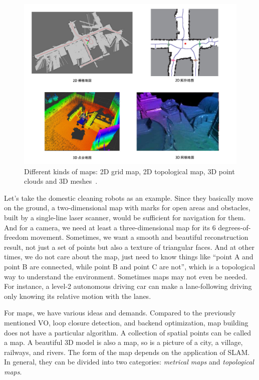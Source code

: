 \begin{figure}
	\centering
	\includegraphics[width=1.0\textwidth]{./resources/whatIsSLAM/map.pdf}
	\caption{Different kinds of maps: 2D grid map, 2D topological map, 3D point clouds and 3D meshes~\cite{Beeson2010}.}
	\label{fig:mapping}
\end{figure}

Let's take the domestic cleaning robots as an example. Since they basically move on the ground, a two-dimensional map with marks for open areas and obstacles, built by a single-line laser scanner, would be sufficient for navigation for them. And for a camera, we need at least a three-dimensional map for its 6 degrees-of-freedom movement. Sometimes, we want a smooth and beautiful reconstruction result, not just a set of points but also a texture of triangular faces. And at other times, we do not care about the map, just need to know things like ``point A and point B are connected, while point B and point C are not'', which is a topological way to understand the environment. Sometimes maps may not even be needed. For instance, a level-2 autonomous driving car can make a lane-following driving only knowing its relative motion with the lanes.

For maps, we have various ideas and demands. Compared to the previously mentioned VO, loop closure detection, and backend optimization, map building does not have a particular algorithm. A collection of spatial points can be called a map. A beautiful 3D model is also a map, so is a picture of a city, a village, railways, and rivers. The form of the map depends on the application of SLAM. In general, they can be divided into two categories: \emph{metrical maps} and \emph{topological maps}.

